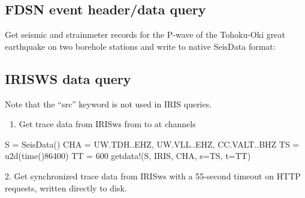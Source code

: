\documentclass[letterpaper,11pt,english]{sphinxmanual}
\begin{document}
\subsection{FDSN event header/data query}
\label{\detokenize{src/Appendices/examples:fdsn-event-header-data-query}}
Get seismic and strainmeter records for the P-wave of the Tohoku-Oki great earthquake on two borehole stations and write to native SeisData format:

\begin{sphinxVerbatim}[commandchars=\\\{\}]
   
 
\end{sphinxVerbatim}


\subsection{IRISWS data query}
\label{\detokenize{src/Appendices/examples:irisws-data-query}}
Note that the “src” keyword is not used in IRIS queries.
\begin{enumerate}
\def\theenumi{\arabic{enumi}}
\def\labelenumi{\theenumi .}
\makeatletter\def\p@enumii{\p@enumi \theenumi .}\makeatother
\item {} 
Get trace data from IRISws from  to  at channels 

\end{enumerate}

\begin{sphinxVerbatim}[commandchars=\\\{\}]
S = SeisData()
CHA = \PYGZdq{}UW.TDH..EHZ, UW.VLL..EHZ, CC.VALT..BHZ\PYGZdq{}
TS = u2d(time()\PYGZhy{}86400)
TT = 600
get\PYGZus{}data!(S, \PYGZdq{}IRIS\PYGZdq{}, CHA, s=TS, t=TT)
\end{sphinxVerbatim}

2. Get synchronized trace data from IRISws with a 55-second timeout on HTTP requests, written directly to disk.

\begin{sphinxVerbatim}[commandchars=\\\{\}]
  
  
  
        
\end{sphinxVerbatim}
\end{document}
